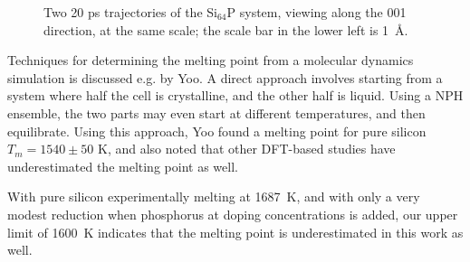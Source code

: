 \documentclass[11pt,bibliography=totoc,index=totoc]{scrbook}   %
\begin{document}
\begin{figure}[htbp]
    \begin{center}
    \end{center}
    \caption{Two 20 ps trajectories of the Si$_{64}$P system, viewing along the 001 direction, at the same scale; the scale bar in the lower left is 1~Å.}
    \label{fig:dance}
\end{figure}

Techniques for determining the melting point from a molecular dynamics simulation is discussed e.g. by Yoo.\cite{Yoo:2009} 
A direct approach involves starting from a system where half the cell is crystalline, and the other half is liquid. 
Using a NPH ensemble, the two parts may even start at different temperatures, and then equilibrate. 
Using this approach, Yoo found a melting point for pure silicon $T_m = 1540 \pm 50$ K, and also noted that other DFT-based studies have 
underestimated the melting point as well.\cite{Yoo:2009}

With pure silicon experimentally melting at \SI{1687}{\kelvin}, and with only a very modest reduction when phosphorus at doping concentrations is added,\cite{Safarian:2011} our upper limit of \SI{1600}{\kelvin} indicates that the melting point is underestimated in this work as well.
\end{document}
